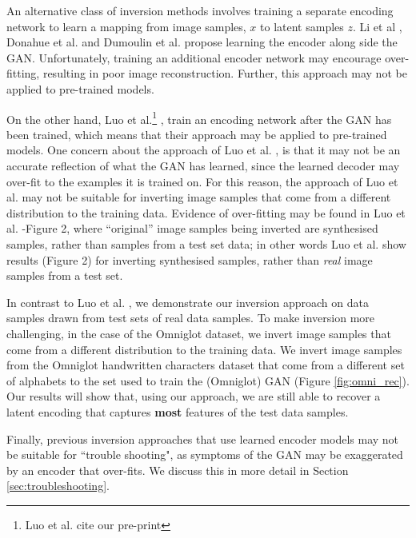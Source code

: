 \documentclass[journal]{IEEEtran}
\begin{document}
An alternative class of inversion methods involves training a separate encoding network to learn a mapping from image samples, $x$ to latent samples $z$. Li et al \cite{li2017alice}, Donahue et al. \cite{donahue2016adversarial} and Dumoulin et al. \cite{dumoulin2016adversarially} propose learning the encoder along side the GAN. Unfortunately, training an additional encoder network may encourage over-fitting, resulting in poor image reconstruction. Further, this approach may not be applied to pre-trained models. 

On the other hand, Luo et al.\footnote{Luo et al. cite our pre-print} \cite{luo2017learning}, train an encoding network after the GAN has been trained, which means that their approach may be applied to pre-trained models. One concern about the approach of Luo et al. \cite{luo2017learning}, is that it may not be an accurate reflection of what the GAN has learned, since the learned decoder may over-fit to the examples it is trained on. For this reason, the approach of Luo et al. \cite{luo2017learning} may not be suitable for inverting image samples that come from a different distribution to the training data. Evidence of over-fitting may be found in Luo et al. \cite{luo2017learning}-Figure 2, where ``original'' image samples being inverted are synthesised samples, rather than samples from a test set data; in other words Luo et al. \cite{luo2017learning} show results (Figure 2) for inverting synthesised samples, rather than \textit{real} image samples from a test set. 

In contrast to Luo et al. \cite{luo2017learning}, we demonstrate our inversion approach on data samples drawn from test sets of real data samples. To make inversion more challenging, in the case of the Omniglot dataset, we invert image samples that come from a different distribution to the training data. We invert image samples from the Omniglot handwritten characters dataset that come from a different set of alphabets to the set used to train the (Omniglot) GAN  (Figure \ref{fig:omni_rec}). Our results will show that, using our approach, we are still able to recover a latent encoding that captures \textbf{most} features of the test data samples.


Finally, previous inversion approaches that use learned encoder models \cite{li2017alice, donahue2016adversarial, dumoulin2016adversarially, luo2017learning} may not be suitable for ``trouble shooting", as symptoms of the GAN may be exaggerated by an encoder that over-fits. We discuss this in more detail in Section \ref{sec:troubleshooting}.
\end{document}
